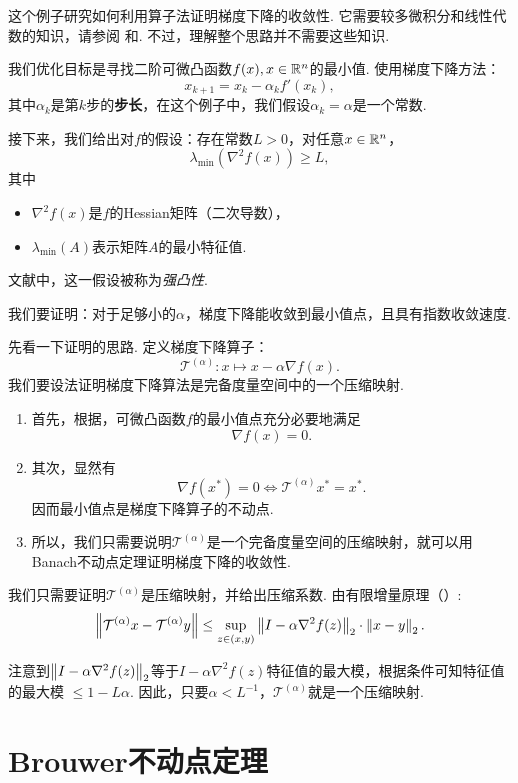 \begin{example}[梯度下降的收敛性]\label{ex:gradient-descent}
这个例子研究如何利用算子法证明梯度下降的收敛性. 它需要较多微积分和线性代数的知识，请参阅 和. 不过，理解整个思路并不需要这些知识.

我们优化目标是寻找二阶可微凸函数$f(x),x\in \mathbb{R}^n$的最小值. 使用梯度下降方法：
\[x_{k+1}=x_k-\alpha_k f'(x_k),\]
其中$\alpha_k$是第$k$步的\textbf{步长}，在这个例子中，我们假设$\alpha_k=\alpha$是一个常数.


接下来，我们给出对$f$的假设：存在常数$L>0$，对任意$x\in \mathbb{R}^n$，
    \[\lambda_{\min}(\nabla^2 f(x))\geq L,\]
其中
    \begin{itemize}
        \item $\nabla^2f(x)$是$f$的Hessian矩阵（二次导数），
        \item $\lambda_{\min}(A)$表示矩阵$A$的最小特征值.
    \end{itemize}
文献中，这一假设被称为\textit{强凸性}.

我们要证明：对于足够小的$\alpha$，梯度下降能收敛到最小值点，且具有指数收敛速度.

先看一下证明的思路. 定义梯度下降算子：
    \[\mathcal T^{(\alpha)}: x\mapsto x - \alpha\nabla f(x).\]
我们要设法证明梯度下降算法是完备度量空间中的一个压缩映射. 
\begin{enumerate}
    \item 首先，根据，可微凸函数$f$的最小值点充分必要地满足
    \[\nabla f(x)=0.\]
    \item 其次，显然有
    \[\nabla f(x^*)=0 \iff \mathcal T^{(\alpha)}x^*=x^*.\]
    因而最小值点是梯度下降算子的不动点.
    \item 所以，我们只需要说明$\mathcal T^{(\alpha)}$是一个完备度量空间的压缩映射，就可以用Banach不动点定理证明梯度下降的收敛性.
\end{enumerate}

我们只需要证明$\mathcal T^{(\alpha)}$是压缩映射，并给出压缩系数. 由有限增量原理（）:
\[\left\|\mathcal T^{(\alpha)}x - \mathcal T^{(\alpha)}y\right\| \leq \sup_{z\in(x,y)}\left\|I - \alpha \nabla^2 f(z)\right\|_2\cdot\left\|x-y\right\|_2.\]

注意到$\left\|I-\alpha\nabla^2f(z)\right\|_2$等于$I-\alpha\nabla^2f(z)$特征值的最大模，根据条件可知特征值的最大模 $\leq 1-L\alpha$. 因此，只要$\alpha<L^{-1}$，$\mathcal T^{(\alpha)}$就是一个压缩映射.
\end{example}

\section{Brouwer不动点定理}

